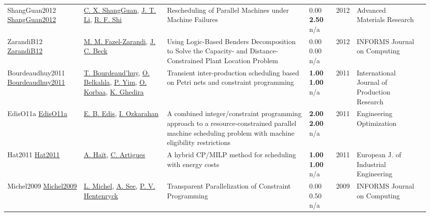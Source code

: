 {\begin{longtable}{p{3cm}p{5cm}p{10cm}p{1cm}rp{2.5cm}l}
ShangGuan2012 \href{http://dx.doi.org/10.4028/www.scientific.net/amr.443-444.724}{ShangGuan2012} & \hyperref[auth:a1980]{C. X. ShangGuan}, \hyperref[auth:a1981]{J. T. Li}, \hyperref[auth:a1982]{R. F. Shi} & Rescheduling of Parallel Machines under Machine Failures & \noindent{}\textcolor{black!50}{0.00} \textbf{2.50} n/a & 2012 & Advanced Materials Research & \cite{ShangGuan2012}\\
ZarandiB12 \href{http://dx.doi.org/10.1287/ijoc.1110.0458}{ZarandiB12} & \hyperref[auth:a944]{M. M. Fazel-Zarandi}, \hyperref[auth:a89]{J. C. Beck} & Using Logic-Based Benders Decomposition to Solve the Capacity- and Distance-Constrained Plant Location Problem & \noindent{}\textcolor{black!50}{0.00} \textcolor{black!50}{0.00} n/a & 2012 & \cellcolor{red!20}INFORMS Journal on Computing & \cite{ZarandiB12}\\
Bourdeaudhuy2011 \href{http://dx.doi.org/10.1080/00207543.2010.519113}{Bourdeaudhuy2011} & \hyperref[auth:a1648]{T. Bourdeaud'huy}, \hyperref[auth:a1649]{O. Belkahla}, \hyperref[auth:a680]{P. Yim}, \hyperref[auth:a679]{O. Korbaa}, \hyperref[auth:a1650]{K. Ghedira} & Transient inter-production scheduling based on Petri nets and constraint programming & \noindent{}\textbf{1.00} \textbf{1.00} n/a & 2011 & \cellcolor{red!20}International Journal of Production Research & \cite{Bourdeaudhuy2011}\\
EdisO11a \href{http://dx.doi.org/10.1080/03052151003759117}{EdisO11a} & \hyperref[auth:a346]{E. B. Edis}, \hyperref[auth:a348]{I. Ozkarahan} & A combined integer/constraint programming approach to a resource-constrained parallel machine scheduling problem with machine eligibility restrictions & \noindent{}\textbf{2.00} \textbf{2.00} n/a & 2011 & \cellcolor{red!20}Engineering Optimization & \cite{EdisO11a}\\
Hat2011 \href{http://dx.doi.org/10.1504/ejie.2011.042742}{Hat2011} & \hyperref[auth:a1161]{A. Haït}, \hyperref[auth:a6]{C. Artigues} & \cellcolor{green!10}A hybrid CP/MILP method for scheduling with energy costs & \noindent{}\textbf{1.00} \textbf{1.00} n/a & 2011 & European J. of Industrial Engineering & \cite{Hat2011}\\
Michel2009 \href{http://dx.doi.org/10.1287/ijoc.1080.0313}{Michel2009} & \hyperref[auth:a32]{L. Michel}, \hyperref[auth:a1804]{A. See}, \hyperref[auth:a148]{P. V. Hentenryck} & Transparent Parallelization of Constraint Programming & \noindent{}\textcolor{black!50}{0.00} 0.50 n/a & 2009 & \cellcolor{red!20}INFORMS Journal on Computing & \cite{Michel2009}\\

\end{longtable}}
